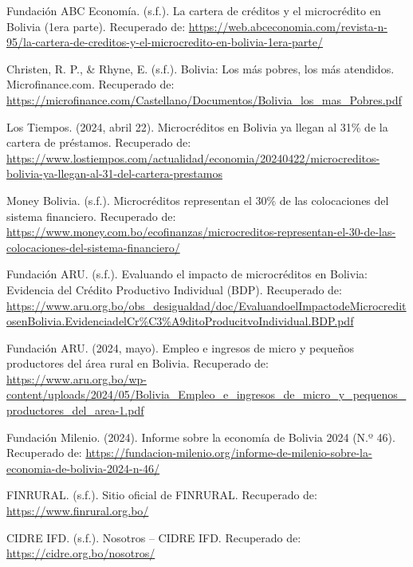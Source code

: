 \documentclass[Royal,times,sageh]{sagej}
\begin{document}
Fundación ABC Economía. (s.f.). La cartera de créditos y el microcrédito
en Bolivia (1era parte). Recuperado de:
\url{https://web.abceconomia.com/revista-n-95/la-cartera-de-creditos-y-el-microcredito-en-bolivia-1era-parte/}

Christen, R. P., \& Rhyne, E. (s.f.). Bolivia: Los más pobres, los más
atendidos. Microfinance.com. Recuperado de:
\url{https://microfinance.com/Castellano/Documentos/Bolivia_los_mas_Pobres.pdf}

Los Tiempos. (2024, abril 22). Microcréditos en Bolivia ya llegan al
31\% de la cartera de préstamos. Recuperado de:
\url{https://www.lostiempos.com/actualidad/economia/20240422/microcreditos-bolivia-ya-llegan-al-31-del-cartera-prestamos}

Money Bolivia. (s.f.). Microcréditos representan el 30\% de las
colocaciones del sistema financiero. Recuperado de:
\url{https://www.money.com.bo/ecofinanzas/microcreditos-representan-el-30-de-las-colocaciones-del-sistema-financiero/}

Fundación ARU. (s.f.). Evaluando el impacto de microcréditos en Bolivia:
Evidencia del Crédito Productivo Individual (BDP). Recuperado de:
\url{https://www.aru.org.bo/obs_desigualdad/doc/EvaluandoelImpactodeMicrocreditosenBolivia.EvidenciadelCr\%C3\%A9ditoProducitvoIndividual.BDP.pdf}

Fundación ARU. (2024, mayo). Empleo e ingresos de micro y pequeños
productores del área rural en Bolivia. Recuperado de:
\url{https://www.aru.org.bo/wp-content/uploads/2024/05/Bolivia_Empleo_e_ingresos_de_micro_y_pequenos_productores_del_area-1.pdf}

Fundación Milenio. (2024). Informe sobre la economía de Bolivia 2024
(N.º 46). Recuperado de:
\url{https://fundacion-milenio.org/informe-de-milenio-sobre-la-economia-de-bolivia-2024-n-46/}

FINRURAL. (s.f.). Sitio oficial de FINRURAL. Recuperado de:
\url{https://www.finrural.org.bo/}

CIDRE IFD. (s.f.). Nosotros -- CIDRE IFD. Recuperado de:
\url{https://cidre.org.bo/nosotros/}



\end{document}
